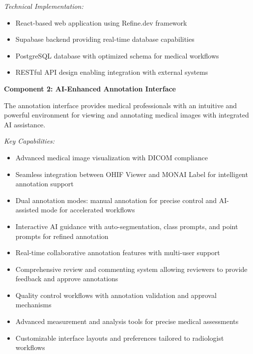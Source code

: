 \textit{Technical Implementation:}
\begin{itemize}
    \item React-based web application using Refine.dev framework
    \item Supabase backend providing real-time database capabilities
    \item PostgreSQL database with optimized schema for medical workflows
    \item RESTful API design enabling integration with external systems
\end{itemize}

\textbf{Component 2: AI-Enhanced Annotation Interface}

The annotation interface provides medical professionals with an intuitive and powerful environment for viewing and annotating medical images with integrated AI assistance.

\textit{Key Capabilities:}
\begin{itemize}
    \item Advanced medical image visualization with DICOM compliance
    \item Seamless integration between OHIF Viewer and MONAI Label for intelligent annotation support
    \item Dual annotation modes: manual annotation for precise control and AI-assisted mode for accelerated workflows
    \item Interactive AI guidance with auto-segmentation, class prompts, and point prompts for refined annotation
    \item Real-time collaborative annotation features with multi-user support
    \item Comprehensive review and commenting system allowing reviewers to provide feedback and approve annotations
    \item Quality control workflows with annotation validation and approval mechanisms
    \item Advanced measurement and analysis tools for precise medical assessments
    \item Customizable interface layouts and preferences tailored to radiologist workflows
\end{itemize}

